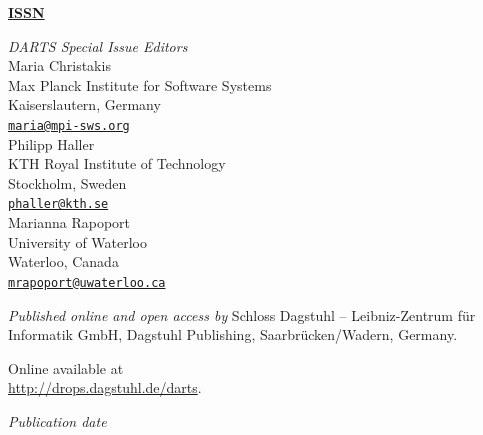 \documentclass[a4paper,UKenglish]{dartsmaster}
\begin{document}
\frontmatter


\maketitle


\begin{publicationinfo}%
\sffamily
\twocolumn

{\Large\bf\sffamily \textbf{\href{http://www.dagstuhl.de/lites}{ISSN \printISSN{}}}}

\bigskip

\newcommand{\orcid}[1]{\url{http://orcid.org/#1}}
\newcommand{\email}[1]{\href{mailto:#1}{\texttt{#1}}}

\emph{DARTS Special Issue Editors} \\[0.2cm]
Maria Christakis \\
Max Planck Institute for Software Systems \\
Kaiserslautern, Germany\\ 
\email{maria@mpi-sws.org}\\

Philipp Haller\\
KTH Royal Institute of Technology\\
Stockholm, Sweden\\ 
\email{phaller@kth.se}\\

Marianna Rapoport\\
University of Waterloo\\
Waterloo, Canada\\
\email{mrapoport@uwaterloo.ca}

\bigskip

\emph{Published online and open access by}\newline
Schloss Dagstuhl -- Leibniz-Zentrum f\"ur Informatik GmbH, Dagstuhl Publishing, Saarbr\"ucken/Wadern, Germany. 

Online available at \\ \url{http://drops.dagstuhl.de/darts}.

\bigskip
\emph{Publication date}\newline
\printDatePublished{}



\bigskip



\end{publicationinfo}
\end{document}
